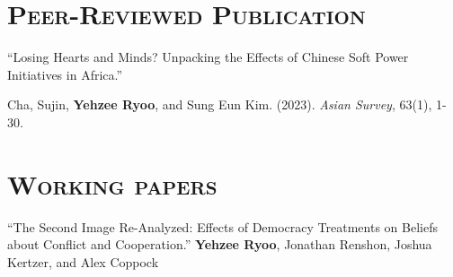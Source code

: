 \documentclass[11pt, letterpaper]{article}
\begin{document}
\vspace{-.8cm}
\section*{\textsc{Peer-Reviewed Publication}}

\vspace{-1mm}
``Losing Hearts and Minds? Unpacking the Effects of Chinese Soft Power Initiatives in Africa.''

Cha, Sujin, \textbf{Yehzee Ryoo}, and Sung Eun Kim. (2023).  \textit{Asian Survey}, 63(1), 1-30.
\vspace{.6em}




\vspace{-5mm}
\section*{\textsc{Working papers}}


\vspace{0mm}
``The Second Image Re-Analyzed: Effects of Democracy Treatments on Beliefs about Conflict and Cooperation.''
\textbf{Yehzee Ryoo}, Jonathan Renshon, Joshua Kertzer, and Alex Coppock
\end{document}
